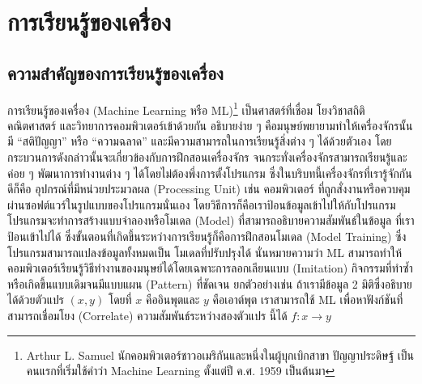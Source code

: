

\chapter{การเรียนรู้ของเครื่อง}
\label{ch:ml}


\section{ความสำคัญของการเรียนรู้ของเครื่อง}
\label{sec:why_ml}

การเรียนรู้ของเครื่อง (Machine Learning หรือ ML)\footnote{Arthur L. Samuel นักคอมพิวเตอร์ชาวอเมริกันและหนึ่งในผู้บุกเบิกสาขา%
ปัญญาประดิษฐ์ เป็นคนแรกที่เริ่มใช้คำว่า Machine Learning ตั้งแต่ปี ค.ศ. 1959 เป็นต้นมา\autocite{samuel1959}} เป็นศาสตร์ที่เชื่อม%
โยงวิชาสถิติ คณิตศาสตร์ และวิทยาการคอมพิวเตอร์เข้าด้วยกัน อธิบายง่าย ๆ คือมนุษย์พยายามทำให้เครื่องจักรนั้นมี \enquote{สติปัญญา} หรือ 
\enquote{ความฉลาด} และมีความสามารถในการเรียนรู้สิ่งต่าง ๆ ได้ด้วยตัวเอง โดยกระบวนการดังกล่าวนั้นจะเกี่ยวข้องกับการฝึกสอนเครื่องจักร%
จนกระทั่งเครื่องจักรสามารถเรียนรู้และค่อย ๆ พัฒนาการทำงานต่าง ๆ ได้โดยไม่ต้องพึ่งการตั้งโปรแกรม ซึ่งในบริบทนี้เครื่องจักรที่เรารู้จักกันดีก็คือ%
อุปกรณ์ที่มีหน่วยประมวลผล (Processing Unit) เช่น คอมพิวเตอร์ ที่ถูกสั่งงานหรือควบคุมผ่านซอฟต์แวร์ในรูปแบบของโปรแกรมนั่นเอง 
โดยวิธีการก็คือเราป้อนข้อมูลเข้าไปให้กับโปรแกรม โปรแกรมจะทำการสร้างแบบจำลองหรือโมเดล (Model) ที่สามารถอธิบายความสัมพันธ์ในข้อมูล%
ที่เราป้อนเข้าไปได้ ซึ่งขั้นตอนที่เกิดขึ้นระหว่างการเรียนรู้ก็คือการฝึกสอนโมเดล (Model Training) ซึ่งโปรแกรมสามารถแปลงข้อมูลทั้งหมดเป็น%
โมเดลที่ปรับปรุงได้ นั่นหมายความว่า ML สามารถทำให้คอมพิวเตอร์เรียนรู้วิธีทำงานของมนุษย์ได้โดยเฉพาะการลอกเลียนแบบ (Imitation) 
กิจกรรมที่ทำซ้ำหรือเกิดขึ้นแบบเดิมจนมีแบบแผน (Pattern) ที่ชัดเจน ยกตัวอย่างเช่น ถ้าเรามีข้อมูล 2 มิติซึ่งอธิบายได้ด้วยตัวแปร $(x,y)$ 
โดยที่ $x$ คืออินพุตและ $y$ คือเอาต์พุต เราสามารถใช้ ML เพื่อหาฟังก์ชันที่สามารถเชื่อมโยง (Correlate) ความสัมพันธ์ระหว่างสองตัวแปร%
นี้ได้ $f: x\rightarrow y$

